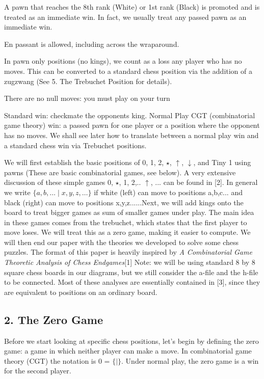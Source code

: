 \vspace{0.5em}

\indent A pawn that reaches the 8th rank (White) or 1st rank (Black) is promoted and is treated as an immediate win. In fact, we usually treat any passed pawn as an immediate win.

\vspace{0.5em}

\indent En passant is allowed, including across the wraparound.

\vspace{0.5em}

\indent In pawn only positions (no kings), we count as a loss any player who has no moves. This can be converted to a standard chess position via the addition of a zugzwang (See 5. The Trebuchet Position for details).

\vspace{0.5em}

\indent There are no null moves: you must play on your turn

\vspace{0.5em}

\indent Standard win: checkmate the opponents king. Normal Play CGT (combinatorial game theory) win: a passed pawn for one player or a position where the opponent has no moves. We shall see later how to translate between a normal play win and a standard chess win via Trebuchet
positions.


\newpage
\indent We will first establish the basic positions of 0, 1, 2, $ \star $, $ \uparrow $, $ \downarrow $, and Tiny 1 using pawns (These are basic combinatorial games, see below). A very extensive discussion of these simple games 0, $\star$, 1, 2,.. $\uparrow$, ... can be found in [2]. In general we write $\{ a, b, \ldots \mid x, y, z, \ldots \}$ if white (left) can move to positions a,b,c... and black (right) can move to positions x,y,z......Next, we will add kings onto the board to treat bigger games as sum of smaller games under play. The main idea in these games comes from the trebuchet, which states that the first player to move loses. We will treat this as a zero game, making it easier to compute. We will then end our paper with the theories we developed to solve some chess puzzles. The format of this paper is heavily inspired by \textit{A Combinatorial Game Theoretic Analysis of Chess Endgames}[1] Note: we will be using standard 8 by 8 square chess boards in our diagrams, but we still consider the a-file and the h-file to be connected. Most of these analyses are essentially contained in [3], since they are equivalent to positions on an ordinary board.
\begin{center}
\section*{2. The Zero Game}
\end{center}
\indent  \indent Before we start looking at specific chess positions, let’s begin by defining the zero game: a game in which neither player can make a move. In combinatorial game theory (CGT) the notation is 0 = $\{|\}$. Under normal play, the zero game is a win for the second player. 

